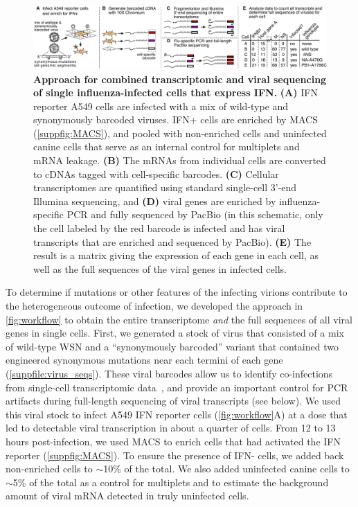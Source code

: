 \documentclass[10pt,letterpaper]{article}
\newenvironment{fullwidth}{%
  \begin{adjustwidth}{-2.3in}{}
}{\end{adjustwidth}}
\newcommand{\FIG}[1]{\autoref{fig:#1}}
\newcommand{\SUPPFILE}[1]{\autoref{suppfile:#1}}
\newcommand{\SUPPFIG}[1]{\autoref{suppfig:#1}}
\begin{document}
\begin{figure}[b!]
\begin{fullwidth}

\includegraphics[width=\linewidth, valign=t]{figures/WorkflowSchematic/SchematicForPaper.pdf}

\caption{
{\bf Approach for combined transcriptomic and viral sequencing of single influenza-infected cells that express IFN.}
{\bf (A)}
IFN reporter A549 cells are infected with a mix of wild-type and synonymously barcoded viruses.
IFN+ cells are enriched by MACS (\SUPPFIG{MACS}), and pooled with non-enriched cells and uninfected canine cells that serve as an internal control for multiplets and mRNA leakage.
{\bf (B)}
The mRNAs from individual cells are converted to cDNAs tagged with cell-specific barcodes.
{\bf (C)}
Cellular transcriptomes are quantified using standard single-cell 3'-end Illumina sequencing, and 
{\bf (D)}
viral genes are enriched by influenza-specific PCR and fully sequenced by PacBio (in this schematic, only the cell labeled by the red barcode is infected and has viral transcripts that are enriched and sequenced by PacBio).
{\bf (E)}
The result is a matrix giving the expression of each gene in each cell, as well as the full sequences of the viral genes in infected cells.
}
\label{fig:workflow}

\end{fullwidth}
\end{figure}

To determine if mutations or other features of the infecting virions contribute to the heterogeneous outcome of infection, we developed the approach in \FIG{workflow} to obtain the entire transcriptome \emph{and} the full sequences of all viral genes in single cells.
First, we generated a stock of virus that consisted of a mix of wild-type WSN and a ``synonymously barcoded'' variant that contained two engineered synonymous mutations near each termini of each gene (\SUPPFILE{virus_seqs}).
These viral barcodes allow us to identify co-infections from single-cell transcriptomic data~\cite{russell2018extreme}, and provide an important control for PCR artifacts during full-length sequencing of viral transcripts (see below).
We used this viral stock to infect A549 IFN reporter cells (\FIG{workflow}A) at a dose that led to detectable viral transcription in about a quarter of cells.
From 12 to 13 hours post-infection, we used MACS to enrich cells that had activated the IFN reporter (\SUPPFIG{MACS}).
To ensure the presence of IFN- cells, we added back non-enriched cells to $\sim$10\% of the total.
We also added uninfected canine cells to $\sim$5\% of the total as a control for multiplets and to estimate the background amount of viral mRNA detected in truly uninfected cells.
\end{document}
